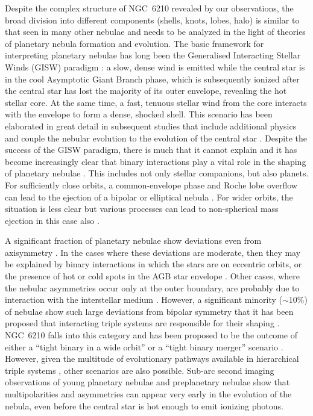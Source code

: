 \documentclass[useAMS, usenatbib]{mnras}
\begin{document}
Despite the complex structure of NGC~6210 revealed by our observations,
the broad division into different components (shells, knots, lobes, halo)
is similar to that seen in many other nebulae
\citep{Balick:1987b}
and needs to be analyzed in the light of theories of planetary nebula formation and evolution.
The basic framework for interpreting planetary nebulae has long been the
Generalised Interacting Stellar Winds (GISW) paradigm \citep{Kwok:1978a, Kahn:1985a}:
a slow, dense wind is emitted while the central star is in the cool
Asymptotic Giant Branch phase, which is subsequently ionized after the central star has lost the majority of its outer envelope,
revealing the hot stellar core.
At the same time, a fast, tenuous stellar wind from the core interacts with the envelope to form a dense, shocked shell.
This scenario has been elaborated in great detail in subsequent studies that include additional physics and couple the nebular evolution to the evolution of the central star \citep[for example,][]{Frank:1994b, Garcia-Segura:1997a, Villaver:2002a, Perinotto:2004a, Garcia-Segura:2006a, Steffen:2013a, Toala:2014a}.
Despite the success of the GISW paradigm,
there is much that it cannot explain \citep{Soker:1997a}
and it has become increasingly clear that binary interactions play a vital role in the shaping of planetary nebulae
\citetext{\citealp{Boffin:2019a} and references therein}.
This includes not only stellar companions, but also planets.
For sufficiently close orbits,
a common-envelope phase and Roche lobe overflow can lead to
the ejection of a bipolar or elliptical nebula \citep{Garcia-Segura:2018a}.
For wider orbits, the situation is less clear but various processes can lead to non-spherical mass ejection in this case also \citep{Kim:2012c, Chen:2017b, Chen:2020a}.

A significant fraction of planetary nebulae show deviations even from axisymmetry \citep{Soker:2001a}.
In the cases where these deviations are moderate,
then they may be explained by binary interactions in which the stars are on eccentric orbits,
or the presence of hot or cold spots in the AGB star envelope \citep{Soker:2002b}.
Other cases, where the nebular asymmetries occur only at the outer boundary,
are probably due to interaction with the interstellar medium \citep{Ali:2012a}.
However, a significant minority (\(\sim 10\%\)) of nebulae show such large deviations from bipolar symmetry \citep{Bear:2017a}
that it has been proposed that interacting triple systems are responsible for their shaping \citep{Soker:2004b, Glanz:2020a}.
NGC~6210 falls into this category and has been proposed to be the outcome of either a ``tight binary in a wide orbit'' or a ``tight binary merger'' scenario \citep{Soker:2016b}.
However, given the multitude of evolutionary pathways available in hierarchical triple systems \citep{Toonen:2016a, Toonen:2020a},
other scenarios are also possible.
Sub-arc second imaging observations of young planetary nebulae \citep{Sahai:1998a, Sahai:2011a, Hsia:2014a}
and preplanetary nebulae \citep{Sahai:2007a}
show that multipolarities and asymmetries can appear very early in the evolution of the nebula,
even before the central star is hot enough to emit ionizing photons.
\end{document}
